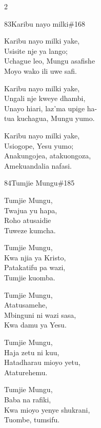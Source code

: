 \documentclass{article}
\begin{document}
\begin{multicols}{2}
\begin{hymn}{83}{Karibu nayo milki}{\#168}
\begin{stanza}
Karibu nayo milki yake,\\
Usisite nje ya lango;\\
Uchague leo, Mungu asafishe\\
Moyo wako ili uwe safi.
\end{stanza}
\begin{stanza}
Karibu nayo milki yake,\\
Ungali nje kweye dhambi,\\
Unayo hiari, laz'ma upige ha-\\
tua kuchagua, Mungu yumo.
\end{stanza}
\begin{stanza}
Karibu nayo milki yake,\\
Usiogope, Yesu yumo;\\
Anakungojea, atakuongoza,\\
Amekuandalia nafasi.
\end{stanza}
\end{hymn}

\begin{hymn}{84}{Tumjie Mungu}{\#185}
\begin{stanza}
Tumjie Mungu,\\
Twajua yu hapa,\\
Roho atusaidie\\
Tuweze kumcha.
\end{stanza}
\begin{chorus}
Tumjie Mungu,\\
Kwa njia ya Kristo,\\
Patakatifu pa wazi,\\
Tumjie kuomba.
\end{chorus}
\begin{stanza}
Tumjie Mungu,\\
Atatusamehe,\\
Mbinguni ni wazi sasa,\\
Kwa damu ya Yesu.
\end{stanza}
\begin{stanza}
Tumjie Mungu,\\
Haja zetu ni kuu,\\
Hatadharau mioyo yetu,\\
Ataturehemu.
\end{stanza}
\begin{stanza}
Tumjie Mungu,\\
Baba na rafiki,\\
Kwa mioyo yenye shukrani,\\
Tuombe, tumsifu.
\end{stanza}
\end{hymn}


\end{multicols}
\end{document}
